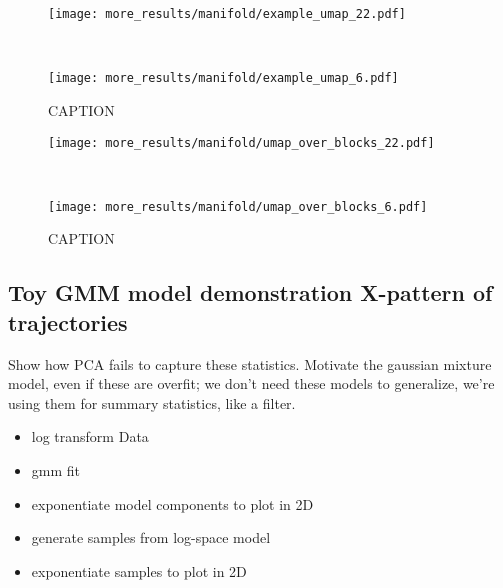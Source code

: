 \documentclass[../main.tex]{subfiles}
\begin{document}

\begin{figure}[tph]
  \centering
  \begin{minipage}{\textwidth}
    \texttt{[image: more\_results/manifold/example\_umap\_22.pdf]}
    \subcaption{}
  \end{minipage}\\%
  \begin{minipage}{\textwidth}
    \texttt{[image: more\_results/manifold/example\_umap\_6.pdf]}
    \subcaption{}
  \end{minipage}
  \caption[Comparison of UMAP projections between two subjects]{CAPTION}\label{fig:umap_comparison}
\end{figure}

\begin{figure}[tph]
  \centering
  \begin{minipage}{\textwidth}
    \texttt{[image: more\_results/manifold/umap\_over\_blocks\_22.pdf]}
    \subcaption{}
  \end{minipage}\\%
  \begin{minipage}{\textwidth}
    \texttt{[image: more\_results/manifold/umap\_over\_blocks\_6.pdf]}
    \subcaption{}
  \end{minipage}
  \caption[Comparison of UMAP projections over blocks between two subjects]{CAPTION}\label{fig:umap_over_blocks_comparison}
\end{figure}

\subsection{Toy GMM model demonstration X-pattern of trajectories}

Show how PCA fails to capture these statistics. Motivate the gaussian mixture model, even if these are overfit; we don't need these models to generalize, we're using them for summary statistics, like a filter.


\begin{itemize}
  \item log transform Data
  \item gmm fit
  \item exponentiate model components to plot in 2D
  \item generate samples from log-space model
  \item exponentiate samples to plot in 2D
\end{itemize}
\end{document}
